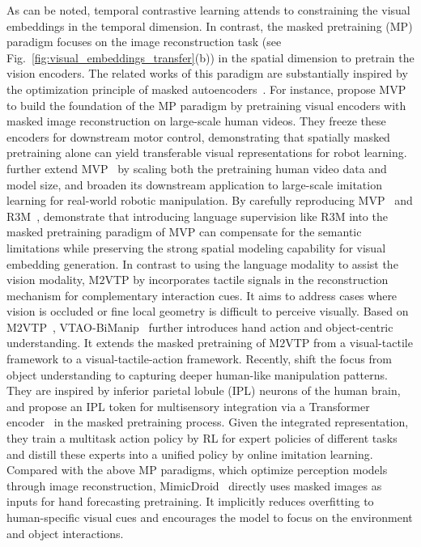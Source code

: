 \documentclass[Afour,sageh,times]{sagej}
\begin{document}
As can be noted, temporal contrastive learning attends to constraining the visual embeddings in the temporal dimension. In contrast, the masked pretraining (MP) paradigm focuses on the image reconstruction task (see Fig.~\ref{fig:visual_embeddings_transfer}(b)) in the spatial dimension to pretrain the vision encoders. The related works of this paradigm are substantially inspired by the optimization principle of masked autoencoders~\citep{he2022masked}. For instance, \cite{xiao2022masked} propose MVP to build the foundation of the MP paradigm by pretraining visual encoders with masked image reconstruction on large-scale human videos. They freeze these encoders for downstream motor control, demonstrating that spatially masked pretraining alone can yield transferable visual representations for robot learning. \cite{radosavovic2023real} further extend MVP~\citep{xiao2022masked} by scaling both the pretraining human video data and model size, and broaden its downstream application to large-scale imitation learning for real-world robotic manipulation. By carefully reproducing MVP~\citep{xiao2022masked} and R3M~\citep{nair2022r3m}, \cite{karamcheti2023language} demonstrate that introducing language supervision like R3M into the masked pretraining paradigm of MVP can compensate for the semantic limitations while preserving the strong spatial modeling capability for visual embedding generation. In contrast to \cite{karamcheti2023language} using the language modality to assist the vision modality, M$2$VTP by \cite{liu2024masked} incorporates tactile signals in the reconstruction mechanism for complementary interaction cues. It aims to address cases where vision is occluded or fine local geometry is difficult to perceive visually. Based on M$2$VTP~\citep{liu2024masked}, VTAO-BiManip~\citep{sun2025vtao} further introduces hand action and object-centric understanding. It extends the masked pretraining of M$2$VTP from a visual-tactile framework to a visual-tactile-action framework. Recently, \cite{ye2026visual} shift the focus from object understanding to capturing deeper human-like manipulation patterns. They are inspired by inferior parietal lobule (IPL) neurons of the human brain, and propose an IPL token for multisensory integration via a Transformer encoder~\citep{vaswani2017attention} in the masked pretraining process. Given the integrated representation, they train a multitask action policy by RL for expert policies of different tasks and distill these experts into a unified policy by online imitation learning. 
Compared with the above MP paradigms, which optimize perception models through image reconstruction, MimicDroid~\citep{shah2025mimicdroid} directly uses masked images as inputs for hand forecasting pretraining. It implicitly reduces overfitting to human-specific visual cues and encourages the model to focus on the environment and object interactions.
\end{document}
